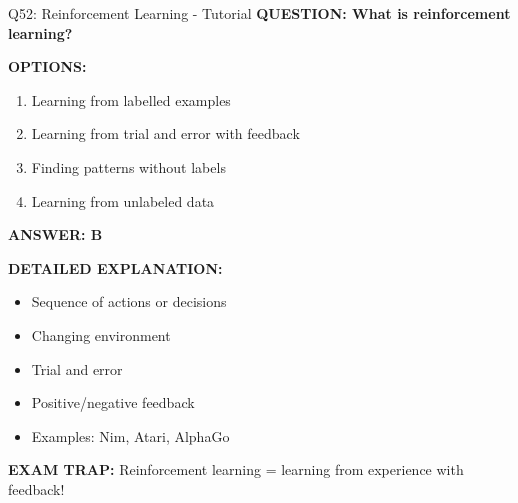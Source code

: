 \documentclass[8pt]{beamer}
\begin{document}
	\begin{frame}{Q52: Reinforcement Learning - Tutorial}
		\fontsize{6.5}{7.5}\selectfont
		\textbf{QUESTION: What is reinforcement learning?}
		
		\vspace{0.1cm}
		\textbf{OPTIONS:}
		\begin{enumerate}
			\item Learning from labelled examples
			\item Learning from trial and error with feedback
			\item Finding patterns without labels
			\item Learning from unlabeled data
		\end{enumerate}
		
		\vspace{0.1cm}
		\textcolor{myblue}{\textbf{ANSWER: B}}
		
		\vspace{0.1cm}
		\textbf{DETAILED EXPLANATION:}
		\begin{itemize}
			\item Sequence of actions or decisions
			\item Changing environment
			\item Trial and error
			\item Positive/negative feedback
			\item Examples: Nim, Atari, AlphaGo
		\end{itemize}
		
		\vspace{0.1cm}
		\textcolor{myred}{\textbf{EXAM TRAP:}} Reinforcement learning = \textcolor{myblue}{learning from experience with feedback}!
	\end{frame}
	
\end{document}
